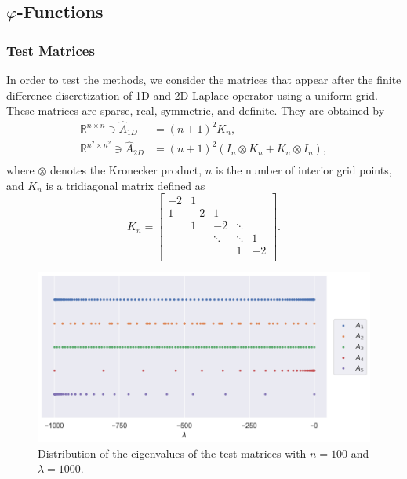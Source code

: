 \subsection{\texorpdfstring{$\varphi$}{Phi}-Functions}
\label{sec:resultsphifunctions}

\subsubsection*{Test Matrices}

In order to test the methods, we consider the matrices that appear
after the finite difference discretization of 1D and 2D Laplace operator using a uniform grid.
These matrices are sparse, real, symmetric, and definite.
They are obtained by
\begin{equation*}
    \begin{aligned}
        \mathbb{R}^{n \times n} \ni \hat{A}_{1D} & = (n+1)^2 K_n,\\
        \mathbb{R}^{n^2 \times n^2} \ni \hat{A}_{2D} & = (n+1)^2  (I_n \otimes K_n + K_n \otimes I_n),\\
        \end{aligned}
\end{equation*}
where $\otimes$ denotes the Kronecker product, $n$ is the number of interior
grid points, and $K_n$ is a tridiagonal matrix defined as
\begin{equation*}
    K_n =
    \begin{bmatrix}
        -2 & 1 &  &  &  \\
        1 & -2 & 1 &  &  \\
         & 1 & -2 & \ddots &  \\
         &  & \ddots & \ddots & 1 \\
         &  &  & 1 & -2  \\
    \end{bmatrix}.
\end{equation*}

\begin{figure}[ht!]
    \centering
    \includegraphics[width=.8\textwidth]{img/eigvals.png}
    \caption{
        Distribution of the eigenvalues of the test matrices with $n=100$ and
        $\lambda = 1000$.
    }
    \label{fig:eigenvaluedistributions}
\end{figure}

